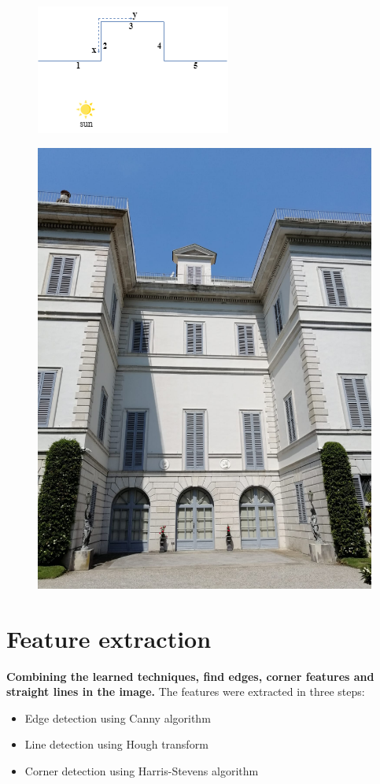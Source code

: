\documentclass[11pt, oneside]{article}
\begin{document}
\begin{figure}[!h]
\centering
\begin{minipage}{.5\textwidth}
	\centering
	\includegraphics[width=1\linewidth]{scene.png}
	\label{scene}
\end{minipage}%
\begin{minipage}{.5\textwidth}
	\centering
	\includegraphics[width=0.5\linewidth]{Villa.png}
	\label{Villa}
\end{minipage}
\end{figure}


\section{Feature extraction}
\textbf{Combining the learned techniques, find edges, corner features and straight lines in the image.} \hfill \break
The features were extracted in three steps:
\begin{itemize}
	\item Edge detection using Canny algorithm
	\item Line detection using Hough transform
	\item Corner detection using Harris-Stevens algorithm
	
\end{itemize}
\end{document}
